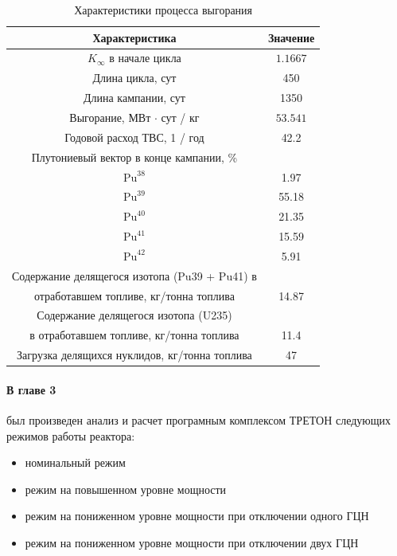 \begin{table}[H]
	\caption{{Характеристики процесса выгорания}}
	\begin{center}
        \begin{tabular}{|c|c|}
        \toprule
         Характеристика & Значение\\ 
         \midrule
         \hline
          $K_\infty$ в начале цикла & $1.1667$\\
         \hline
          Длина цикла, сут & 450 \\
         \hline
          Длина кампании, сут & 1350\\
         \hline
          Выгорание, МВт $\cdot$ сут / кг & $53.541$\\
         \hline
          Годовой расход ТВС, 1 / год & 42.2\\
         \hline
          Плутониевый вектор в конце кампании, \% & \\
         \hline
          $\text{Pu}^{38}$ & 1.97 \\
         \hline
          $\text{Pu}^{39}$ & 55.18 \\
         \hline
          $\text{Pu}^{40}$ & 21.35\\
         \hline
          $\text{Pu}^{41}$ & 15.59 \\
         \hline
          $\text{Pu}^{42}$ & 5.91 \\
         \hline
         Содержание делящегося изотопа (Pu39 + Pu41) в \\ отработавшем топливе, кг/тонна топлива & 14.87\\
         \hline
         Содержание делящегося изотопа (U235)\\ в отработавшем топливе, кг/тонна топлива & 11.4 \\
         \hline
         Загрузка делящихся нуклидов, кг/тонна топлива & 47 \\
         \bottomrule
		\end{tabular}
		\label{tabular:burnup-referat}
	\end{center}
\end{table}

\paragraph*{В главе 3} был произведен анализ и расчет програмным комплексом ТРЕТОН следующих режимов работы реактора:
\begin{itemize}
    \item номинальный режим
    \item режим на повышенном уровне мощности
    \item режим на пониженном уровне мощности при отключении одного ГЦН
    \item режим на пониженном уровне мощности при отключении двух ГЦН
\end{itemize}

